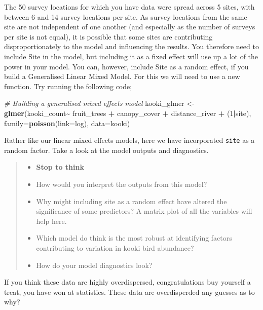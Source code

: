 \documentclass[
]{book}
\newenvironment{Shaded}{\begin{snugshade}}{\end{snugshade}}
\newcommand{\AttributeTok}[1]{\textcolor[rgb]{0.13,0.29,0.53}{#1}}
\newcommand{\CommentTok}[1]{\textcolor[rgb]{0.56,0.35,0.01}{\textit{#1}}}
\newcommand{\DecValTok}[1]{\textcolor[rgb]{0.00,0.00,0.81}{#1}}
\newcommand{\FunctionTok}[1]{\textcolor[rgb]{0.13,0.29,0.53}{\textbf{#1}}}
\newcommand{\NormalTok}[1]{#1}
\newcommand{\OtherTok}[1]{\textcolor[rgb]{0.56,0.35,0.01}{#1}}
\newcommand{\SpecialCharTok}[1]{\textcolor[rgb]{0.81,0.36,0.00}{\textbf{#1}}}
\providecommand{\tightlist}{%
  \setlength{\itemsep}{0pt}\setlength{\parskip}{0pt}}
\begin{document}
The 50 survey locations for which you have data were spread across 5 sites, with between 6 and 14 survey locations per site. As survey locations from the same site are not independent of one another (and especially as the number of surveys per site is not equal), it is possible that some sites are contributing disproportionately to the model and influencing the results. You therefore need to include Site in the model, but including it as a fixed effect will use up a lot of the power in your model. You can, however, include Site as a random effect, if you build a Generalised Linear Mixed Model. For this we will need to use a new function. Try running the following code;

\begin{Shaded}
\begin{Highlighting}[]
\CommentTok{\# Building a generalised mixed effects model}
\NormalTok{kooki\_glmer }\OtherTok{\textless{}{-}} \FunctionTok{glmer}\NormalTok{(kooki\_count}\SpecialCharTok{\textasciitilde{}}\NormalTok{ fruit\_trees }\SpecialCharTok{+}\NormalTok{ canopy\_cover }\SpecialCharTok{+}\NormalTok{ distance\_river }\SpecialCharTok{+}\NormalTok{ (}\DecValTok{1}\SpecialCharTok{|}\NormalTok{site), }\AttributeTok{family=}\FunctionTok{poisson}\NormalTok{(}\AttributeTok{link=}\NormalTok{log), }\AttributeTok{data=}\NormalTok{kooki)}
\end{Highlighting}
\end{Shaded}

Rather like our linear mixed effects models, here we have incorporated \texttt{site} as a random factor. Take a look at the model outputs and diagnostics.

\begin{quote}
\begin{itemize}
\tightlist
\item
  \textbf{Stop to think}
\item
  How would you interpret the outputs from this model?
\item
  Why might including site as a random effect have altered the significance of some predictors? A matrix plot of all the variables will help here.
\item
  Which model do think is the most robust at identifying factors contributing to variation in kooki bird abundance?
\item
  How do your model diagnostics look?
\end{itemize}
\end{quote}

If you think these data are highly overdispersed, congratulations buy yourself a treat, you have won at statistics. These data are overdisperded any guesses as to why?
\end{document}
